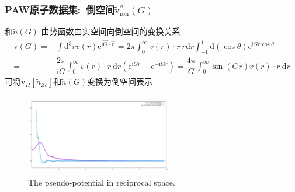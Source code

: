 \documentclass[cjk,slidestop,compress,mathserif,blue]{beamer}
\begin{document}
\frame
{
	\frametitle{\textrm{PAW}原子数据集:~倒空间$\tilde{\mathrm{v}}_{\mathrm{ion}}^a(G)$}和$\tilde n(G)$
	由势函数由实空间向倒空间的变换关系
	\begin{displaymath}
		\begin{aligned}
			\textrm{v}(G)=&\int\mathrm{d}^3r v(r)\mathrm{e}^{\mathrm{i}\vec G\cdot\vec r}=2\pi \int_0^{\infty} v(r)\cdot r~r\mathrm{d}r\int_{-1}^1\mathrm{d}(\cos\theta)\mathrm{e}^{\mathrm{i}Gr\cos\theta}\\
			=&\dfrac{2\pi}{\mathrm{i}G}\int_0^{\infty}v(r)\cdot r~\mathrm{d}r(\mathrm{e}^{\mathrm{i}Gr}-\mathrm{e}^{-\mathrm{i}Gr})=\dfrac{4\pi}G\int_0^{\infty}\sin(Gr)v(r)\cdot r~\mathrm{d}r
		\end{aligned}
	\end{displaymath}
	可将$\mathrm{v}_H[\tilde n_{Zc}]$和$\tilde n(G)$变换为倒空间表示
\begin{figure}[h!]
\vskip -0.12in
\centering
\includegraphics[width=2.5in,height=1.4in,viewport=0 0 1200 630, clip]{Figures/PAW_Vloc_G.png}
\caption{\tiny \textrm{The pseudo-potential in reciprocal space.}}%
\label{pseudo_potential_G}
\end{figure}
}
\end{document}
